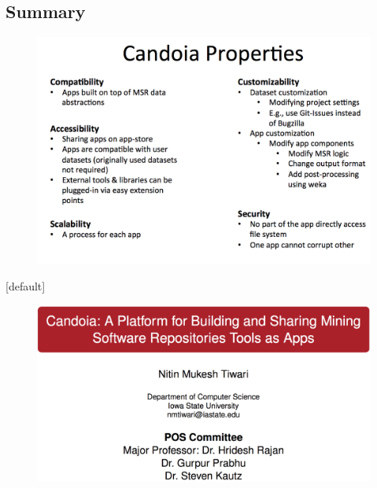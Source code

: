     \subsection{Summary}
        \begin{frame}
            \begin{figure}
                \centering
                    \includegraphics[scale=0.2]{figures/summary.png}
            \end{figure}
        \end{frame}


\makeatletter %
    [default] %
    \def\beamer@entrycode{\vspace*{-\headheight}} %
\makeatother

        \begin{frame}
                \begin{figure}
                    \centering
                    \includegraphics[scale=0.2]{figures/thankyou.png}
                \end{figure}
        \end{frame}


